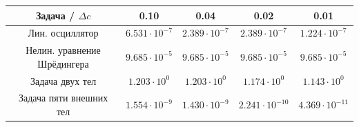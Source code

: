 \begin{table}
	\centering
	\vspace{5mm}
	
	\renewcommand{\arraystretch}{1.2}
	
	\begin{tabular}{|c|c|c|c|c|}
		\hline
		\textbf{Задача / $\Delta c$} &
		\textbf{0.10} &
		\textbf{0.04} &
		\textbf{0.02} &
		\textbf{0.01}
		\\ \hline
		
		Лин. осциллятор &
		$6.531 \cdot 10^{-7}$ &
		$2.389 \cdot 10^{-7}$ &
		$2.389 \cdot 10^{-7}$ &
		$1.224 \cdot 10^{-7}$
		\\ \hline
		
		Нелин. уравнение Шрёдингера &
		$9.685\cdot 10^{-5}$ &
		$9.685\cdot 10^{-5}$  &
		$9.685\cdot 10^{-5}$  &
		$9.685\cdot 10^{-5}$ 
		\\ \hline
		
		Задача двух тел &
		$1.203 \cdot 10^{0}$ &
		$1.203 \cdot 10^{0}$ &
		$1.174 \cdot 10^{0}$ &
		$1.143 \cdot 10^{0}$
		\\ \hline
		
		Задача пяти внешних тел &
		$1.554 \cdot 10^{-9}$ &
		$1.430 \cdot 10^{-9}$ &
		$2.241 \cdot 10^{-10}$ &
		$4.369 \cdot 10^{-11}$
		\\ \hline
		
	\end{tabular}
	
	\renewcommand{\arraystretch}{1}
\end{table}